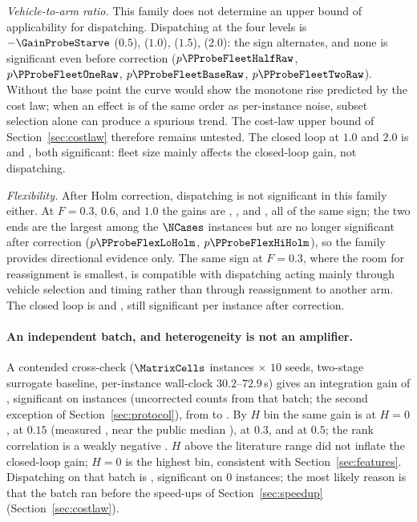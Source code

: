 \emph{Vehicle-to-arm ratio.}
This family does not determine an upper bound of applicability for dispatching.
Dispatching at the four levels is $-\GainProbeStarve$ ($0.5$), \GainProbeFleetOne{} ($1.0$), \GainProbeFleetBase{} ($1.5$), \GainProbeFleetTwo{} ($2.0$): the sign alternates, and none is significant even before correction ($p\PProbeFleetHalfRaw$, $p\PProbeFleetOneRaw$, $p\PProbeFleetBaseRaw$, $p\PProbeFleetTwoRaw$).
Without the base point the curve would show the monotone rise predicted by the cost law; when an effect is of the same order as per-instance noise, subset selection alone can produce a spurious trend.
The cost-law upper bound of Section~\ref{sec:costlaw} therefore remains untested.
The closed loop at $1.0$ and $2.0$ is \GainLoopFleetOne{} and \GainLoopFleetTwo{}, both significant: fleet size mainly affects the closed-loop gain, not dispatching.

\emph{Flexibility.}
After Holm correction, dispatching is not significant in this family either.
At $F=0.3$, $0.6$, and $1.0$ the gains are \GainProbeFlexLo{}, \GainProbeFleetBase{}, and \GainProbeFlexHi{}, all of the same sign; the two ends are the largest among the $\NCases$ instances but are no longer significant after correction ($p\PProbeFlexLoHolm$, $p\PProbeFlexHiHolm$), so the family provides directional evidence only.
The same sign at $F=0.3$, where the room for reassignment is smallest, is compatible with dispatching acting mainly through vehicle selection and timing rather than through reassignment to another arm.
The closed loop is \GainLoopFlexLo{} and \GainLoopFlexHi{}, still significant per instance after correction.

\paragraph{An independent batch, and heterogeneity is not an amplifier.}
A contended cross-check ($\MatrixCells$ instances $\times$ $10$ seeds, two-stage surrogate baseline, per-instance wall-clock $30.2$--$72.9$\,s) gives an integration gain of \GainIntegMatrix{}, significant on \SigIntegMatrix{} instances (uncorrected counts from that batch; the second exception of Section~\ref{sec:protocol}), from \GainIntegMatrixLo{} to \GainIntegMatrixHi{}.
By $H$ bin the same gain is \GainIntegHZero{} at $H=0$, \GainIntegHLow{} at $0.15$ (measured \MatrixHMeasLow{}, near the public median \PubHMed{}), \GainIntegHMid{} at $0.3$, and \GainIntegHHigh{} at $0.5$; the rank correlation is a weakly negative \RhoIntegH{}.
$H$ above the literature range did not inflate the closed-loop gain; $H=0$ is the highest bin, consistent with Section~\ref{sec:features}.
Dispatching on that batch is \GainProbePre{}, significant on $0$ instances; the most likely reason is that the batch ran before the speed-ups of Section~\ref{sec:speedup} (Section~\ref{sec:costlaw}).

